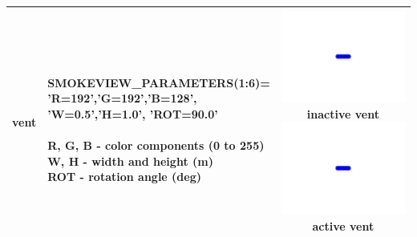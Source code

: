 \begin{longtable}[ht]{|l|l|c|}
{\ct vent} &
\parbox[c]{\boxwidth}{
\hspace{1in} \\
{\ct SMOKEVIEW\_PARAMETERS(1:6)=}\\
{\ct 'R=192','G=192','B=128',}\\
{\ct 'W=0.5','H=1.0', 'ROT=90.0'}\\ \\
R, G, B - color components (0 to 255) \\
W, H - width and height (m) \\
ROT - rotation angle (deg) \\
\hspace{1in}
} &
\parbox[c]{\devicewidth}{
\vspace{0.01in}
\includegraphics[width=\devicewidth]{SCRIPT_FIGURES/vent1}
inactive vent\\
\vspace{0.01in}
\includegraphics[width=\devicewidth]{SCRIPT_FIGURES/vent2}
active vent\\
\vspace{0.01in}
}
\\ \hline
\end{longtable}


